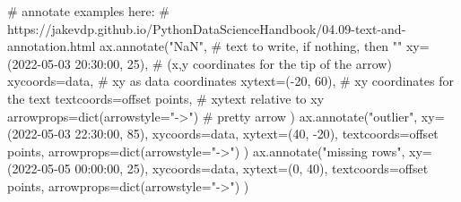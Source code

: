 \documentclass[
  letterpaper,
  DIV=11,
  numbers=noendperiod,
  oneside]{scrreprt}
\newenvironment{Shaded}{\begin{snugshade}}{\end{snugshade}}
\newcommand{\BuiltInTok}[1]{\textcolor[rgb]{0.00,0.23,0.31}{#1}}
\newcommand{\CommentTok}[1]{\textcolor[rgb]{0.37,0.37,0.37}{#1}}
\newcommand{\DecValTok}[1]{\textcolor[rgb]{0.68,0.00,0.00}{#1}}
\newcommand{\NormalTok}[1]{\textcolor[rgb]{0.00,0.23,0.31}{#1}}
\newcommand{\OperatorTok}[1]{\textcolor[rgb]{0.37,0.37,0.37}{#1}}
\newcommand{\StringTok}[1]{\textcolor[rgb]{0.13,0.47,0.30}{#1}}
\begin{document}
\begin{Shaded}
\begin{Highlighting}[]
\CommentTok{\# annotate examples here:}
\CommentTok{\# https://jakevdp.github.io/PythonDataScienceHandbook/04.09{-}text{-}and{-}annotation.html}
\NormalTok{ax.annotate(}\StringTok{"NaN"}\NormalTok{,                             }\CommentTok{\# text to write, if nothing, then ""}
\NormalTok{            xy}\OperatorTok{=}\NormalTok{(}\StringTok{\textquotesingle{}2022{-}05{-}03 20:30:00\textquotesingle{}}\NormalTok{, }\DecValTok{25}\NormalTok{),    }\CommentTok{\# (x,y coordinates for the tip of the arrow)}
\NormalTok{            xycoords}\OperatorTok{=}\StringTok{\textquotesingle{}data\textquotesingle{}}\NormalTok{,                   }\CommentTok{\# xy as \textquotesingle{}data\textquotesingle{} coordinates}
\NormalTok{            xytext}\OperatorTok{=}\NormalTok{(}\OperatorTok{{-}}\DecValTok{20}\NormalTok{, }\DecValTok{60}\NormalTok{),                  }\CommentTok{\# xy coordinates for the text}
\NormalTok{            textcoords}\OperatorTok{=}\StringTok{\textquotesingle{}offset points\textquotesingle{}}\NormalTok{,        }\CommentTok{\# xytext relative to xy}
\NormalTok{            arrowprops}\OperatorTok{=}\BuiltInTok{dict}\NormalTok{(arrowstyle}\OperatorTok{=}\StringTok{"{-}\textgreater{}"}\NormalTok{)   }\CommentTok{\# pretty arrow}
\NormalTok{           )}
\NormalTok{ax.annotate(}\StringTok{"outlier"}\NormalTok{,}
\NormalTok{            xy}\OperatorTok{=}\NormalTok{(}\StringTok{\textquotesingle{}2022{-}05{-}03 22:30:00\textquotesingle{}}\NormalTok{, }\DecValTok{85}\NormalTok{),}
\NormalTok{            xycoords}\OperatorTok{=}\StringTok{\textquotesingle{}data\textquotesingle{}}\NormalTok{,}
\NormalTok{            xytext}\OperatorTok{=}\NormalTok{(}\DecValTok{40}\NormalTok{, }\OperatorTok{{-}}\DecValTok{20}\NormalTok{),}
\NormalTok{            textcoords}\OperatorTok{=}\StringTok{\textquotesingle{}offset points\textquotesingle{}}\NormalTok{,}
\NormalTok{            arrowprops}\OperatorTok{=}\BuiltInTok{dict}\NormalTok{(arrowstyle}\OperatorTok{=}\StringTok{"{-}\textgreater{}"}\NormalTok{)}
\NormalTok{           )}
\NormalTok{ax.annotate(}\StringTok{"missing rows"}\NormalTok{,}
\NormalTok{            xy}\OperatorTok{=}\NormalTok{(}\StringTok{\textquotesingle{}2022{-}05{-}05 00:00:00\textquotesingle{}}\NormalTok{, }\DecValTok{25}\NormalTok{),}
\NormalTok{            xycoords}\OperatorTok{=}\StringTok{\textquotesingle{}data\textquotesingle{}}\NormalTok{,}
\NormalTok{            xytext}\OperatorTok{=}\NormalTok{(}\DecValTok{0}\NormalTok{, }\DecValTok{40}\NormalTok{),}
\NormalTok{            textcoords}\OperatorTok{=}\StringTok{\textquotesingle{}offset points\textquotesingle{}}\NormalTok{,}
\NormalTok{            arrowprops}\OperatorTok{=}\BuiltInTok{dict}\NormalTok{(arrowstyle}\OperatorTok{=}\StringTok{"{-}\textgreater{}"}\NormalTok{)}
\NormalTok{           )}


\end{Highlighting}
\end{Shaded}
\end{document}
